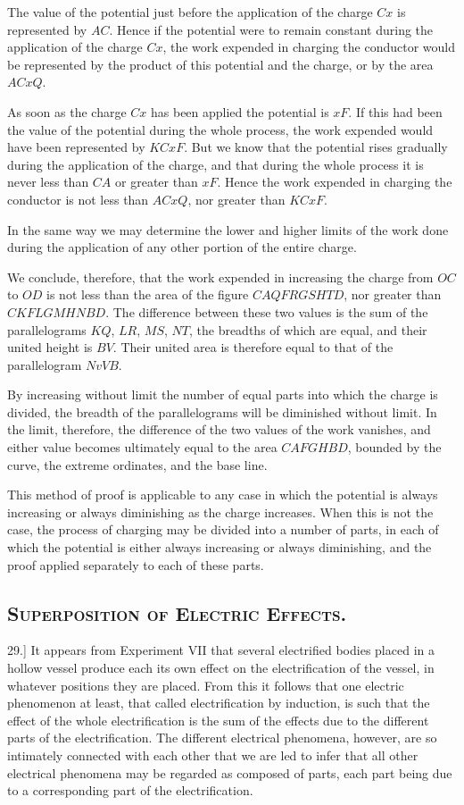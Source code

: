 \documentclass[12pt,oneside]{book}[2021/10/04]
\newcommand{\Heading}{\centering\normalfont}
\newcommand{\Section}[1]{\subsection*{\normalsize\Heading\scshape #1}}
\newcommand{\Runhead}[1]{\fancyhead[C]{\iffloatpage{}{\small#1}}}
\newcommand{\article}[1]{\phantomsection \label{art:#1}{#1.]}}
\newcommand{\¬}{\hphantom{0}}
\begin{document}
The value of the potential just before the application of the
charge \(Cx\) is represented by \(AC\). Hence if the potential were to
remain constant during the application of the charge \(Cx\), the work
expended in charging the conductor would be represented by the
product of this potential and the charge, or by the area \(ACxQ\).

\Runhead{WORK DONE IN CHARGING A CONDUCTOR.}
As soon as the charge \(Cx\) has been applied the potential is \(xF\).
If this had been the value of the potential during the whole
process, the work expended would have been represented by
\(KCxF\). But we know that the potential rises gradually during
the application of the charge, and that during the whole process
it is never less than \(CA\) or greater than \(xF\). Hence the work
expended in charging the conductor is not less than \(ACxQ\), nor
greater than \(KCxF\).

In the same way we may determine the lower and higher
limits of the work done during the application of any other portion
of the entire charge.

We conclude, therefore, that the work expended in increasing
the charge from \(OC\) to \(OD\) is not less than the area of the figure
\(CAQFRGSHTD\), nor greater than \(CKFLGMHNBD\). The difference
between these two values is the sum of the parallelograms
\(KQ\), \(LR\), \(MS\), \(NT\), the breadths of which are equal, and their
united height is \(BV\). Their united area is therefore equal to that
of the parallelogram \(NvVB\).

By increasing without limit the number of equal parts into
which the charge is divided, the breadth of the parallelograms will
be diminished without limit. In the limit, therefore, the difference
of the two values of the work vanishes, and either value becomes
ultimately equal to the area \(CAFGHBD\), bounded by the curve,
the extreme ordinates, and the base line.

This method of proof is applicable to any case in which the
potential is always increasing or always diminishing as the charge
increases. When this is not the case, the process of charging
may be divided into a number of parts, in each of which the
potential is either always increasing or always diminishing, and
the proof applied separately to each of these parts.

\Section{Superposition of Electric Effects.}

\article{29} It appears from Experiment VII that several electrified bodies
placed in a hollow vessel produce each its own effect on the
electrification of the vessel, in whatever positions they are placed.
From this it follows that one electric phenomenon at least, that
called electrification by induction, is such that the effect of the
whole electrification is the sum of the effects due to the different
parts of the electrification. The different electrical phenomena,
however, are so intimately connected with each other that we are
led to infer that all other electrical phenomena may be regarded
as composed of parts, each part being due to a corresponding part
of the electrification.
\end{document}
